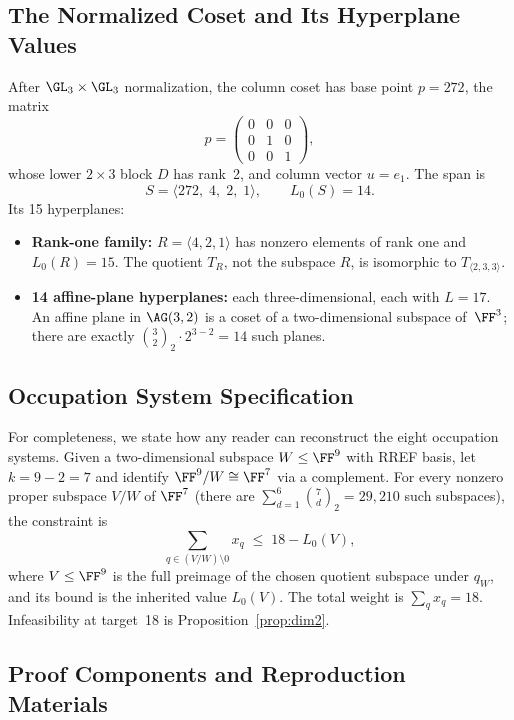 \documentclass[11pt,a4paper]{article}
\begin{document}
\subsection{The Normalized Coset and Its Hyperplane Values}

After $\GL_3\times\GL_3$ normalization, the column coset has base point $p=272$, the matrix
\[
  p = \begin{pmatrix} 0&0&0\\ 0&1&0\\ 0&0&1\end{pmatrix},
\]
whose lower $2\times 3$ block $D$ has rank~2, and column vector $u=e_1$.  The span is
\[
  S = \langle 272,\; 4,\; 2,\; 1\rangle,\qquad L_0(S)=14.
\]
Its 15 hyperplanes:
\begin{itemize}
  \item \textbf{Rank-one family:} $R=\langle4,2,1\rangle$ has nonzero elements of rank one and $L_0(R)=15$. The quotient $T_R$, not the subspace $R$, is isomorphic to $T_{\langle2,3,3\rangle}$.
  \item \textbf{14 affine-plane hyperplanes:} each three-dimensional, each with $L=17$.  An affine plane in $\AG(3,2)$ is a coset of a two-dimensional subspace of~$\FF^3$; there are exactly $\binom{3}{2}_2\cdot 2^{3-2}=14$ such planes.
\end{itemize}

\subsection{Occupation System Specification}

For completeness, we state how any reader can reconstruct the eight occupation systems.  Given a two-dimensional subspace $W\le\FF^9$ with RREF basis, let $k=9-2=7$ and identify $\FF^9/W\cong\FF^7$ via a complement.  For every nonzero proper subspace $V/W$ of $\FF^7$ (there are $\sum_{d=1}^{6}\binom{7}{d}_2 = 29{,}210$ such subspaces), the constraint is
\[
  \sum_{q\in(V/W)\setminus 0} x_q \;\le\; 18-L_0(V),
\]
where $V\le\FF^9$ is the full preimage of the chosen quotient subspace under $q_W$, and its bound is the inherited value $L_0(V)$. The total weight is $\sum_qx_q=18$. Infeasibility at target~18 is Proposition~\ref{prop:dim2}.


\subsection{Proof Components and Reproduction Materials}\label{app:repository}
\end{document}
